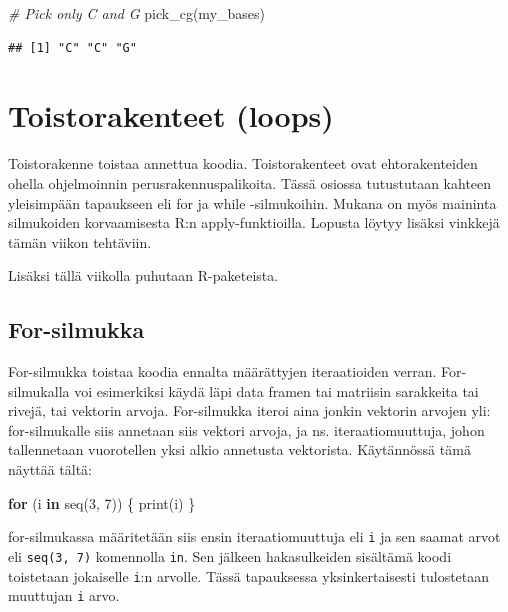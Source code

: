 \documentclass[
]{book}
\newenvironment{Shaded}{\begin{snugshade}}{\end{snugshade}}
\newcommand{\CommentTok}[1]{\textcolor[rgb]{0.56,0.35,0.01}{\textit{#1}}}
\newcommand{\ControlFlowTok}[1]{\textcolor[rgb]{0.13,0.29,0.53}{\textbf{#1}}}
\newcommand{\DecValTok}[1]{\textcolor[rgb]{0.00,0.00,0.81}{#1}}
\newcommand{\FunctionTok}[1]{\textcolor[rgb]{0.00,0.00,0.00}{#1}}
\newcommand{\NormalTok}[1]{#1}
\begin{document}
\begin{Shaded}
\begin{Highlighting}[]
\CommentTok{\# Pick only C and G}
\FunctionTok{pick\_cg}\NormalTok{(my\_bases)}
\end{Highlighting}
\end{Shaded}

\begin{verbatim}
## [1] "C" "C" "G"
\end{verbatim}

\hypertarget{loops}{%
\chapter{Toistorakenteet (loops)}\label{loops}}

Toistorakenne toistaa annettua koodia. Toistorakenteet ovat ehtorakenteiden ohella ohjelmoinnin perusrakennuspalikoita. Tässä osiossa tutustutaan kahteen yleisimpään tapaukseen eli for ja while -silmukoihin. Mukana on myös maininta silmukoiden korvaamisesta R:n apply-funktioilla. Lopusta löytyy lisäksi vinkkejä tämän viikon tehtäviin.

Lisäksi tällä viikolla puhutaan R-paketeista.

\hypertarget{for-silmukka}{%
\section{For-silmukka}\label{for-silmukka}}

For-silmukka toistaa koodia ennalta määrättyjen iteraatioiden verran. For-silmukalla voi esimerkiksi käydä läpi data framen tai matriisin sarakkeita tai rivejä, tai vektorin arvoja. For-silmukka iteroi aina jonkin vektorin arvojen yli: for-silmukalle siis annetaan siis vektori arvoja, ja ns. iteraatiomuuttuja, johon tallennetaan vuorotellen yksi alkio annetusta vektorista. Käytännössä tämä näyttää tältä:

\begin{Shaded}
\begin{Highlighting}[]
\ControlFlowTok{for}\NormalTok{ (i }\ControlFlowTok{in} \FunctionTok{seq}\NormalTok{(}\DecValTok{3}\NormalTok{, }\DecValTok{7}\NormalTok{)) \{}
  \FunctionTok{print}\NormalTok{(i)}
\NormalTok{\}}
\end{Highlighting}
\end{Shaded}

for-silmukassa määritetään siis ensin iteraatiomuuttuja eli \texttt{i} ja sen saamat arvot eli \texttt{seq(3,\ 7)} komennolla \texttt{in}. Sen jälkeen hakasulkeiden sisältämä koodi toistetaan jokaiselle \texttt{i}:n arvolle. Tässä tapauksessa yksinkertaisesti tulostetaan muuttujan \texttt{i} arvo.
\end{document}
